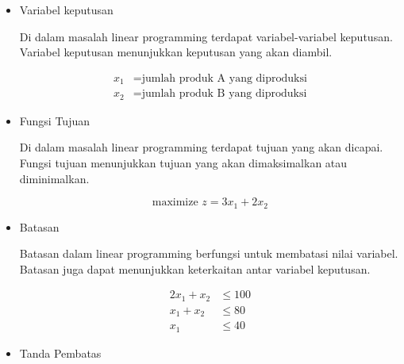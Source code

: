 \begin{itemize}
	\item Variabel keputusan
	
		Di dalam masalah linear programming terdapat variabel-variabel keputusan. Variabel keputusan menunjukkan keputusan yang akan diambil.
		
		\begin{equation*}
			\begin{split}
				x_1 &= \text{jumlah produk A yang diproduksi} \\
    			x_2 &= \text{jumlah produk B yang diproduksi}
			\end{split}
		\end{equation*}
		
	\item Fungsi Tujuan
	
		Di dalam masalah linear programming terdapat tujuan yang akan dicapai. Fungsi tujuan menunjukkan tujuan yang akan dimaksimalkan atau diminimalkan.
		
		\begin{equation*}
			\text{maximize } z = 3x_1 + 2x_2
		\end{equation*}

	\item Batasan
	
		Batasan dalam linear programming berfungsi untuk membatasi nilai variabel. Batasan juga dapat menunjukkan keterkaitan antar variabel keputusan.
		
		\begin{equation*}
			\begin{split}
				2x_1 + x_2 &\leq 100 \\
    			x_1 + x_2 &\leq 80 \\
    			x_1 &\leq 40
			\end{split}
		\end{equation*}
		
	\item Tanda Pembatas
		

\end{itemize}
